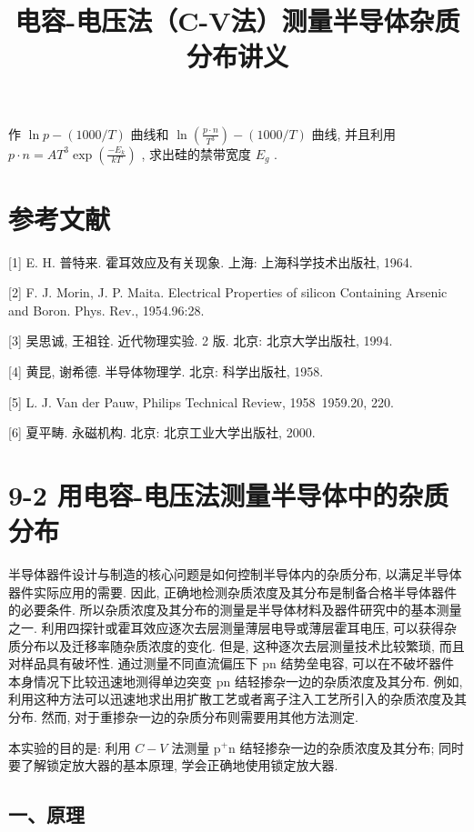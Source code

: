 \documentclass[12pt,a4paper]{article}
\title{电容-电压法（C-V法）测量半导体杂质分布讲义}
\date{}
\begin{document}
\maketitle

作 \(\ln p - (1000 / T)\) 曲线和 \(\ln \left(\frac{p \cdot n}{T^3}\right) - (1000 / T)\) 曲线, 并且利用 \(p \cdot n = AT^3 \exp \left(\frac{-E_k}{kT}\right)\) , 求出硅的禁带宽度 \(E_g\) .

\section*{参考文献}

[1] E. H. 普特来. 霍耳效应及有关现象. 上海: 上海科学技术出版社, 1964.

[2] F. J. Morin, J. P. Maita. Electrical Properties of silicon Containing Arsenic and Boron. Phys. Rev., 1954.96:28.

[3] 吴思诚, 王祖铨. 近代物理实验. 2 版. 北京: 北京大学出版社, 1994.

[4] 黄昆, 谢希德. 半导体物理学. 北京: 科学出版社, 1958.

[5] L. J. Van der Pauw, Philips Technical Review, 1958~1959.20, 220.

[6] 夏平畴. 永磁机构. 北京: 北京工业大学出版社, 2000.

\section*{9-2 用电容-电压法测量半导体中的杂质分布}

半导体器件设计与制造的核心问题是如何控制半导体内的杂质分布, 以满足半导体器件实际应用的需要. 因此, 正确地检测杂质浓度及其分布是制备合格半导体器件的必要条件. 所以杂质浓度及其分布的测量是半导体材料及器件研究中的基本测量之一. 利用四探针或霍耳效应逐次去层测量薄层电导或薄层霍耳电压, 可以获得杂质分布以及迁移率随杂质浓度的变化. 但是, 这种逐次去层测量技术比较繁琐, 而且对样品具有破坏性. 通过测量不同直流偏压下 \(\mathrm{pn}\) 结势垒电容, 可以在不破坏器件本身情况下比较迅速地测得单边突变 \(\mathrm{pn}\) 结轻掺杂一边的杂质浓度及其分布. 例如, 利用这种方法可以迅速地求出用扩散工艺或者离子注入工艺所引入的杂质浓度及其分布. 然而, 对于重掺杂一边的杂质分布则需要用其他方法测定.

本实验的目的是: 利用 \(C - V\) 法测量 \(\mathrm{p}^+ \mathrm{n}\) 结轻掺杂一边的杂质浓度及其分布; 同时要了解锁定放大器的基本原理, 学会正确地使用锁定放大器.

\subsection*{一、原理}
\end{document}
